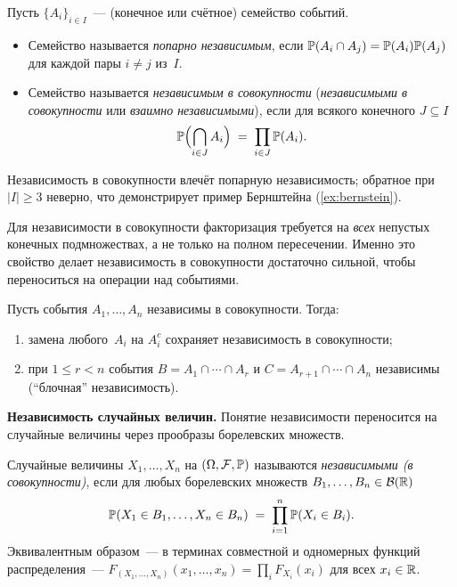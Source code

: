 \begin{definition}
\label{def:indep-many}
Пусть $\{A_i\}_{i \in I}$~--- (конечное или счётное) семейство событий.
\begin{itemize}
  \item Семейство называется \emph{попарно независимым}, если $\mathbb{P}(A_i \cap A_j) = \mathbb{P}(A_i) \mathbb{P}(A_j)$ для каждой пары $i \neq j$ из~$I$.
  \item Семейство называется \emph{независимым в совокупности} (\emph{независимыми в совокупности} или \emph{взаимно независимыми}), если для всякого конечного $J \subseteq I$
        \[
          \mathbb{P}\Bigl(\bigcap_{i \in J} A_i\Bigr) \;=\; \prod_{i \in J} \mathbb{P}(A_i).
        \]
\end{itemize}
Независимость в совокупности влечёт попарную независимость; обратное при $|I| \geq 3$ неверно, что демонстрирует пример Бернштейна (\cref{ex:bernstein}).
\end{definition}

Для независимости в совокупности факторизация требуется на \emph{всех} непустых конечных подмножествах, а не только на полном пересечении. Именно это свойство делает независимость в совокупности достаточно сильной, чтобы переноситься на операции над событиями.

\begin{proposition}
\label{prop:indep-stability}
Пусть события $A_1, \dots, A_n$ независимы в совокупности. Тогда:
\begin{enumerate}[label=(\alph*)]
  \item замена любого~$A_i$ на $A_i^c$ сохраняет независимость в совокупности;
  \item при $1 \leq r < n$ события $B = A_1 \cap \cdots \cap A_r$ и $C = A_{r+1} \cap \cdots \cap A_n$ независимы (``блочная'' независимость).
\end{enumerate}
\end{proposition}

\medskip
\noindent\textbf{Независимость случайных величин.} Понятие независимости переносится на случайные величины через прообразы борелевских множеств.

\begin{definition}
\label{def:indep-rv}
Случайные величины $X_1, \dots, X_n$ на $(\Omega, \mathcal{F}, \mathbb{P})$ называются \emph{независимыми (в совокупности)}, если для любых борелевских множеств $B_1, \dots, B_n \in \mathcal{B}(\mathbb{R})$
\[
  \mathbb{P}(X_1 \in B_1, \dots, X_n \in B_n) \;=\; \prod_{i=1}^{n} \mathbb{P}(X_i \in B_i).
\]
Эквивалентным образом~--- в терминах совместной и одномерных функций распределения~--- $F_{(X_1, \dots, X_n)}(x_1, \dots, x_n) = \prod_i F_{X_i}(x_i)$ для всех $x_i \in \mathbb{R}$.
\end{definition}


